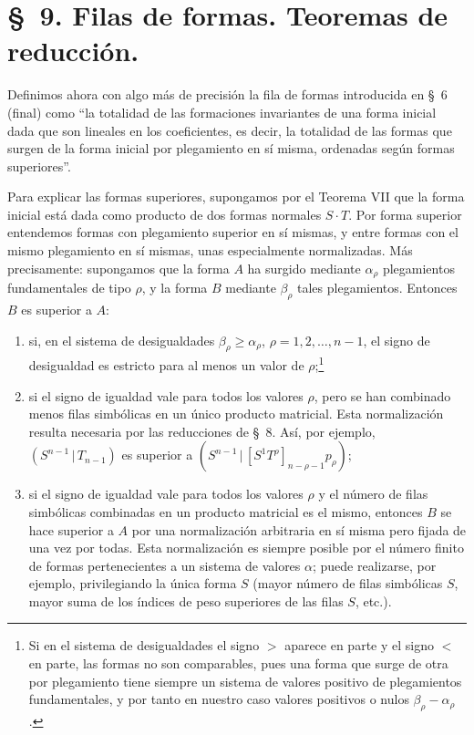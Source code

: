 \documentclass[11pt]{article}
\newcommand{\pair}[2]{(#1\,|\,#2)}
\begin{document}
\section*{\S\ 9. Filas de formas. Teoremas de reducción.}
Definimos ahora con algo más de precisión la fila de formas introducida en \S\ 6 (final) como ``la totalidad de las formaciones invariantes de una forma inicial dada que son lineales en los coeficientes, es decir, la totalidad de las formas que surgen de la forma inicial por plegamiento en sí misma, ordenadas según formas superiores''.

Para explicar las formas superiores, supongamos por el Teorema VII que la forma inicial está dada como producto de dos formas normales $S\cdot T$. Por forma superior entendemos formas con plegamiento superior en sí mismas, y entre formas con el mismo plegamiento en sí mismas, unas especialmente normalizadas. Más precisamente: supongamos que la forma $A$ ha surgido mediante $\alpha_\rho$ plegamientos fundamentales de tipo $\rho$, y la forma $B$ mediante $\beta_\rho$ tales plegamientos. Entonces $B$ es superior a $A$:
\begin{enumerate}
\item si, en el sistema de desigualdades $\beta_\rho\ge\alpha_\rho$, $\rho=1,2,\ldots,n-1$, el signo de desigualdad es estricto para al menos un valor de $\rho$;\footnote{Si en el sistema de desigualdades el signo $>$ aparece en parte y el signo $<$ en parte, las formas no son comparables, pues una forma que surge de otra por plegamiento tiene siempre un sistema de valores positivo de plegamientos fundamentales, y por tanto en nuestro caso valores positivos o nulos $\beta_\rho-\alpha_\rho$.}
\item si el signo de igualdad vale para todos los valores $\rho$, pero se han combinado menos filas simbólicas en un único producto matricial. Esta normalización resulta necesaria por las reducciones de \S\ 8. Así, por ejemplo, $\pair{S^{n-1}}{T_{n-1}}$ es superior a $\pair{S^{n-1}}{[S^1T^\rho]_{n-\rho-1}p_\rho}$;
\item si el signo de igualdad vale para todos los valores $\rho$ y el número de filas simbólicas combinadas en un producto matricial es el mismo, entonces $B$ se hace superior a $A$ por una normalización arbitraria en sí misma pero fijada de una vez por todas. Esta normalización es siempre posible por el número finito de formas pertenecientes a un sistema de valores $\alpha$; puede realizarse, por ejemplo, privilegiando la única forma $S$ (mayor número de filas simbólicas $S$, mayor suma de los índices de peso superiores de las filas $S$, etc.).
\end{enumerate}
\end{document}
